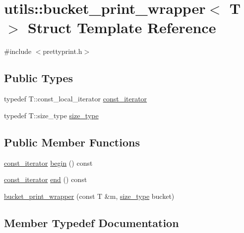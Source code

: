 \hypertarget{structutils_1_1bucket__print__wrapper}{}\section{utils\+::bucket\+\_\+print\+\_\+wrapper$<$ T $>$ Struct Template Reference}
\label{structutils_1_1bucket__print__wrapper}


{\ttfamily \#include $<$prettyprint.\+h$>$}

\subsection*{Public Types}
\begin{DoxyCompactItemize}
\item 
typedef T\+::const\+\_\+local\+\_\+iterator \mbox{\hyperlink{structutils_1_1bucket__print__wrapper_a366d347432ad92e4805eb1f14c287131}{const\+\_\+iterator}}
\item 
typedef T\+::size\+\_\+type \mbox{\hyperlink{structutils_1_1bucket__print__wrapper_a24e9dd014bd836f72cf6d410b669d812}{size\+\_\+type}}
\end{DoxyCompactItemize}
\subsection*{Public Member Functions}
\begin{DoxyCompactItemize}
\item 
\mbox{\hyperlink{structutils_1_1bucket__print__wrapper_a366d347432ad92e4805eb1f14c287131}{const\+\_\+iterator}} \mbox{\hyperlink{structutils_1_1bucket__print__wrapper_a2fedb23cb885fb89e9dca474d1dd8a88}{begin}} () const
\item 
\mbox{\hyperlink{structutils_1_1bucket__print__wrapper_a366d347432ad92e4805eb1f14c287131}{const\+\_\+iterator}} \mbox{\hyperlink{structutils_1_1bucket__print__wrapper_a4f07519e738b3625b9877766a712b034}{end}} () const
\item 
\mbox{\hyperlink{structutils_1_1bucket__print__wrapper_ae600a8ce56dfd669dfec51e55b2d15a6}{bucket\+\_\+print\+\_\+wrapper}} (const T \&m, \mbox{\hyperlink{structutils_1_1bucket__print__wrapper_a24e9dd014bd836f72cf6d410b669d812}{size\+\_\+type}} bucket)
\end{DoxyCompactItemize}


\subsection{Member Typedef Documentation}
\mbox{\label{structutils_1_1bucket__print__wrapper_a366d347432ad92e4805eb1f14c287131}} 

